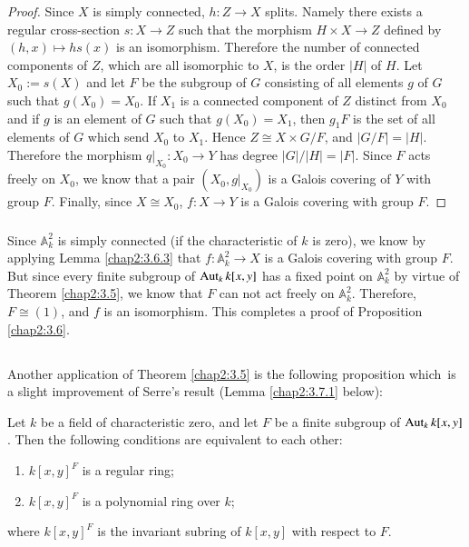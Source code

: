 \begin{proof}
Since $X$ is simply connected, $h:Z\to X$ splits. Namely there exists
a regular cross-section $s:X\to Z$ such that the morphism $H\times
X\to Z$ defined by $(h,x)\mapsto hs(x)$ is an isomorphism. Therefore
the number of connected components of $Z$, which are all isomorphic to
$X$, is the order $|H|$ of $H$. Let $X_{0}:=s(X)$ and let $F$ be the
subgroup of $G$ consisting of all elements $g$ of $G$ such that
$g(X_{0})=X_{0}$. If $X_{1}$ is a connected component of $Z$ distinct
from $X_{0}$ and if $g$ is an element of $G$ such that
$g(X_{0})=X_{1}$, then $g_{1}F$ is the set of all elements of $G$
which send $X_{0}$ to $X_{1}$. Hence $Z\cong X\times G/F$, and
$|G/F|=|H|$. Therefore the morphism $q|_{X_{0}}:X_{0}\to Y$ has degree
$|G|/|H|=|F|$. Since $F$ acts freely on $X_{0}$, we know that a pair
$(X_{0},g|_{X_{0}})$ is a Galois covering of $Y$ with group
$F$. Finally, since $X\cong X_{0}$, $f:X\to Y$ is a Galois covering
with group $F$.
\end{proof}

\subsubsection{}\label{chap2:3.6.4}
\begin{proofofprop*}[3.6 ]
  Since $\mathbb{A}^{2}_{k}$ is simply connected (if the characteristic
  of $k$ is zero), we know by applying Lemma \ref{chap2:3.6.3} that
  $f:\mathbb{A}^{2}_{k}\to X$ is a Galois covering with group $F$. But
  since every finite subgroup of $\operatorname{Aut}_{k}k[x,y]$ has a fixed point on
  $\mathbb{A}^{2}_{k}$ by virtue of Theorem \ref{chap2:3.5}, we know that
  $F$ can not act freely on $\mathbb{A}^{2}_{k}$. Therefore, $F\cong
  (1)$, and $f$ is an isomorphism. This completes a proof of Proposition
  \ref{chap2:3.6}.
\end{proofofprop*}

\subsection{}\label{chap2:3.7}
Another application of Theorem \ref{chap2:3.5} is the following
proposition which\pageoriginale\ is a slight improvement of Serre's
result (\cf Lemma \ref{chap2:3.7.1} below):

\begin{prop*}
Let $k$ be a field of characteristic zero, and let $F$ be a finite
subgroup of $\operatorname{Aut}_{k}k[x,y]$. Then the following conditions are
equivalent to each other:
\begin{enumerate}
\renewcommand{\labelenumi}{\rm(\theenumi)}
\item $k[x,y]^{F}$ is a regular ring;

\item $k[x,y]^{F}$ is a polynomial ring over $k$;
\end{enumerate}
where $k[x,y]^{F}$ is the invariant subring of $k[x,y]$ with respect
to $F$.
\end{prop*}


